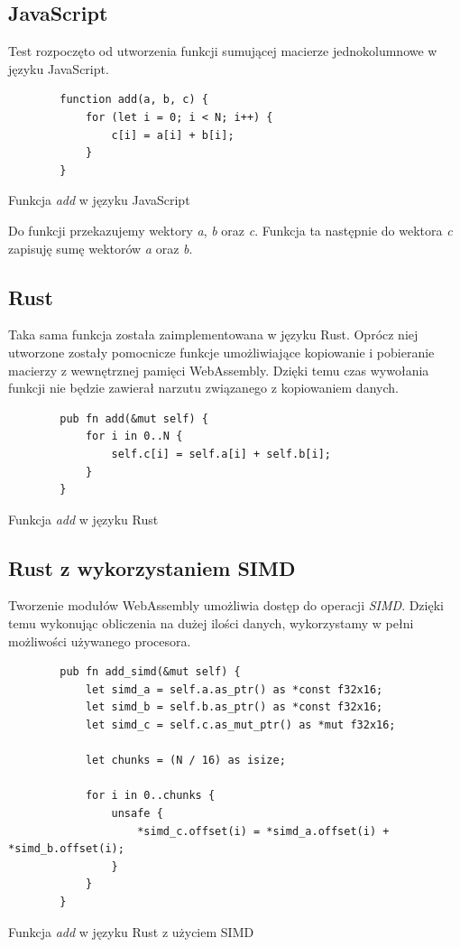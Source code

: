 \documentclass[language=polish,type=master]{aghmodern}
\begin{document}
\subsection{JavaScript}
Test rozpoczęto od utworzenia funkcji sumującej macierze jednokolumnowe w języku JavaScript.

\begin{listing}[H]
    \begin{verbatim}
        function add(a, b, c) {
            for (let i = 0; i < N; i++) {
                c[i] = a[i] + b[i];
            }
        }
    \end{verbatim}
    \caption{Funkcja \emph{add} w języku JavaScript}
\end{listing}

Do funkcji przekazujemy wektory \emph{a}, \emph{b} oraz \emph{c}.
Funkcja ta następnie do wektora \emph{c} zapisuję sumę wektorów \emph{a} oraz \emph{b}.

\subsection{Rust}
Taka sama funkcja została zaimplementowana w języku Rust.
Oprócz niej utworzone zostały pomocnicze funkcje umożliwiające kopiowanie i pobieranie macierzy z wewnętrznej pamięci WebAssembly.
Dzięki temu czas wywołania funkcji nie będzie zawierał narzutu związanego z kopiowaniem danych.

\begin{listing}[H]
    \begin{verbatim}
        pub fn add(&mut self) {
            for i in 0..N {
                self.c[i] = self.a[i] + self.b[i];
            }
        }
    \end{verbatim}
    \caption{Funkcja \emph{add} w języku Rust}
\end{listing}

\subsection{Rust z wykorzystaniem SIMD}
Tworzenie modułów WebAssembly umożliwia dostęp do operacji \emph{SIMD}\footnotemark{}.
Dzięki temu wykonując obliczenia na dużej ilości danych, wykorzystamy w pełni możliwości używanego procesora.

\begin{listing}[H]
    \begin{verbatim}
        pub fn add_simd(&mut self) {
            let simd_a = self.a.as_ptr() as *const f32x16;
            let simd_b = self.b.as_ptr() as *const f32x16;
            let simd_c = self.c.as_mut_ptr() as *mut f32x16;
    
            let chunks = (N / 16) as isize;

            for i in 0..chunks {
                unsafe {
                    *simd_c.offset(i) = *simd_a.offset(i) + *simd_b.offset(i);
                }
            }
        }
    \end{verbatim}
    \caption{Funkcja \emph{add} w języku Rust z użyciem SIMD}
\end{listing}
\end{document}

